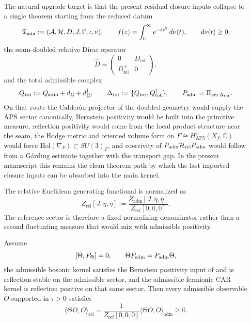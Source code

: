 \begin{remark}
The natural upgrade target is that the present residual closure inputs collapse to a
single theorem starting from the reduced datum
\[
\mathfrak T_{\mathrm{min}}:=(\mathcal A,\mathcal H,D,J,\Gamma,\iota,\nu),
\qquad
f(z)=\int_0^\infty e^{-t z^2}\,d\nu(t),
\qquad
d\nu(t)\ge 0,
\]
the seam-doubled relative Dirac operator
\[
\widehat D=
\begin{pmatrix}
0 & D^-_{\mathrm{rel}}\\
D^+_{\mathrm{rel}} & 0
\end{pmatrix},
\]
and the total admissible complex
\[
Q_{\mathrm{tot}}:=Q_{\mathrm{adm}}+d_\Sigma+d_\Sigma^\dagger,
\qquad
\Delta_{\mathrm{tot}}:=\{Q_{\mathrm{tot}},Q_{\mathrm{tot}}^\dagger\},
\qquad
P_{\mathrm{adm}}=\Pi_{\ker\Delta_{\mathrm{tot}}}.
\]
On that route the Calder\'on projector of the doubled geometry would supply the APS
sector canonically, Bernstein positivity would be built into the primitive
measure, reflection positivity would come from the local product structure near
the seam, the Hodge metric and oriented volume form on
$F\cong H^1_{\mathrm{APS}}(X_f,\mathbb C)$ would force
$\mathrm{Hol}(\nabla_F)\subset SU(3)_F$, and coercivity of
$P_{\mathrm{adm}}\mathcal H_{\mathrm{rel}}P_{\mathrm{adm}}$ would follow from a G{\aa}rding estimate together with the
transport gap. In the present manuscript this remains the clean theorem path by
which the last imported closure inputs can be absorbed into the main kernel.
\end{remark}

\begin{definition}
\label{def:relative-generating-functional}
The relative Euclidean generating functional is normalized as
\[
Z_{\mathrm{rel}}[J,\eta,\bar\eta]
:=
\frac{Z_{\mathrm{adm}}[J,\eta,\bar\eta]}{Z_{\mathrm{ref}}[0,0,0]}.
\]
The reference sector is therefore a fixed normalizing denominator rather than a second fluctuating measure that would mix with admissible positivity.
\end{definition}

\begin{lemma}
\label{lem:admissible-reflection-positivity}
Assume
\[
[\Theta,P_\Theta]=0,
\qquad
\Theta P_{\mathrm{adm}}=P_{\mathrm{adm}}\Theta,
\]
the admissible bosonic kernel satisfies the Bernstein positivity input of  and is reflection-stable on the admissible sector, and the admissible fermionic CAR kernel is reflection positive on that same sector. Then every admissible observable $O$ supported in $\tau>0$ satisfies
\[
\langle \Theta O,O\rangle_{\mathrm{rel}}
=
\frac{1}{Z_{\mathrm{ref}}[0,0,0]}
\langle \Theta O,O\rangle_{\mathrm{adm}}
\ge 0.
\]
\end{lemma}

